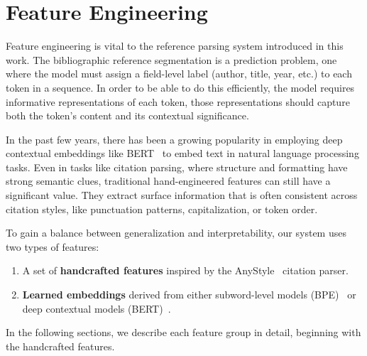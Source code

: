 \section{Feature Engineering}

Feature engineering is vital to the reference parsing system introduced in this work. The bibliographic reference segmentation is a prediction problem, one where the model must assign a field-level label (author, title, year, etc.) to each token in a sequence. In order to be able to do this efficiently, the model requires informative representations of each token, those representations should capture both the token’s content and its contextual significance.

In the past few years, there has been a growing popularity in employing deep contextual embeddings like BERT~\cite{2019-bert} to embed text in natural language processing tasks. Even in tasks like citation parsing, where structure and formatting have strong semantic clues, traditional hand-engineered features can still have a significant value. They extract surface information that is often consistent across citation styles, like punctuation patterns, capitalization, or token order.

To gain a balance between generalization and interpretability, our system uses two types of features:
\begin{enumerate}
\item A set of \textbf{handcrafted features} inspired by the AnyStyle~\cite{anystyle} citation parser.
\item \textbf{Learned embeddings} derived from either subword-level models (BPE)~\cite{bpemb} or deep contextual models (BERT)~\cite{2019-bert}.
\end{enumerate}
In the following sections, we describe each feature group in detail, beginning with the handcrafted features.


\clearpage


\clearpage

